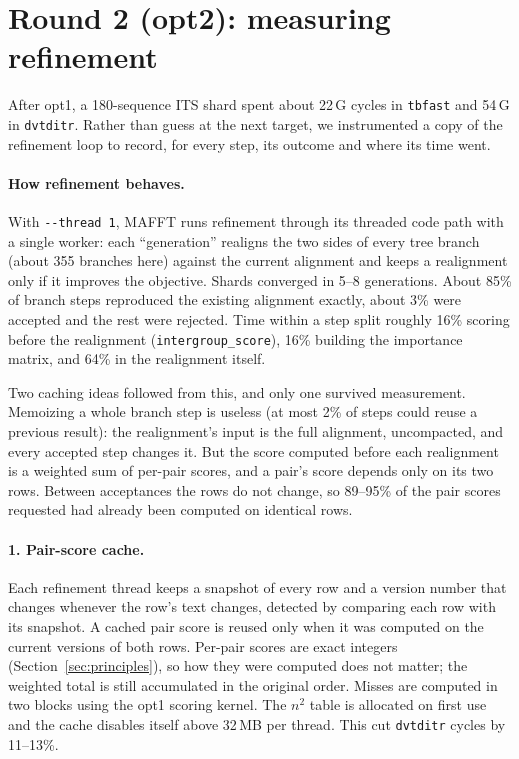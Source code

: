 \documentclass[11pt]{article}
\newcommand{\code}[1]{\texttt{#1}}
\begin{document}
\section{Round 2 (opt2): measuring refinement}
\label{sec:round2}

After opt1, a 180-sequence ITS shard spent about 22\,G cycles in \code{tbfast} and 54\,G in
\code{dvtditr}. Rather than guess at the next target, we instrumented a copy of the
refinement loop to record, for every step, its outcome and where its time went.

\paragraph{How refinement behaves.} With \code{-{}-thread 1}, MAFFT runs refinement through
its threaded code path with a single worker: each ``generation'' realigns the two sides of
every tree branch (about 355 branches here) against the current alignment and keeps a
realignment only if it improves the objective. Shards converged in 5--8 generations. About
85\% of branch steps reproduced the existing alignment exactly, about 3\% were accepted
and the rest were rejected. Time within a step split roughly 16\% scoring before the
realignment (\code{intergroup\_score}), 16\% building the importance matrix, and 64\% in the
realignment itself.

Two caching ideas followed from this, and only one survived measurement. Memoizing a whole
branch step is useless (at most 2\% of steps could reuse a previous result): the
realignment's input is the full alignment, uncompacted, and every accepted step changes it.
But the score computed before each realignment is a weighted sum of per-pair scores, and a
pair's score depends only on its two rows. Between acceptances the rows do not change, so
89--95\% of the pair scores requested had already been computed on identical rows.

\paragraph{1. Pair-score cache.} Each refinement thread keeps a snapshot of every row and a
version number that changes whenever the row's text changes, detected by comparing each
row with its snapshot. A cached pair score is reused only when it was computed on the
current versions of both rows. Per-pair scores are exact integers (Section~\ref{sec:principles}),
so how they were computed does not matter; the weighted total is still accumulated in the
original order. Misses are computed in two blocks using the opt1 scoring kernel. The
$n^2$ table is allocated on first use and the cache disables itself above 32\,MB per thread.
This cut \code{dvtditr} cycles by 11--13\%.
\end{document}

